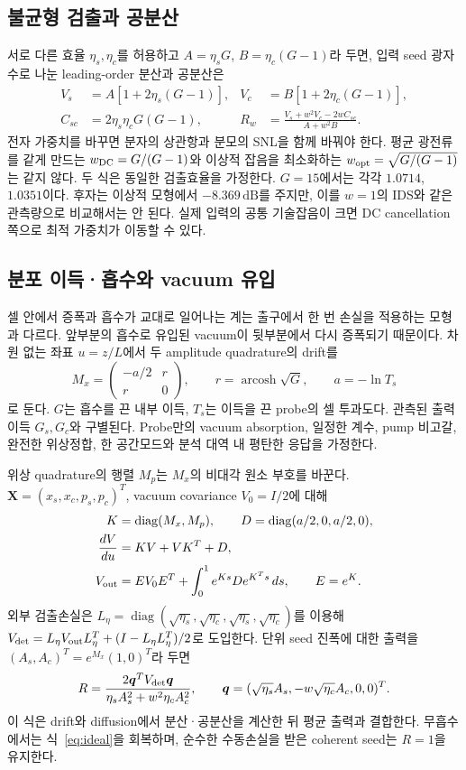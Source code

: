 \documentclass[11pt,a4paper]{article}
\newcommand{\dB}{\,\mathrm{dB}}
\begin{document}
\subsection{불균형 검출과 공분산}
서로 다른 효율 $\eta_s,\eta_c$를 허용하고 $A=\eta_sG$,
$B=\eta_c(G-1)$라 두면, 입력 seed 광자수로 나눈 leading-order
분산과 공분산은
\begin{align}
 V_s&=A[1+2\eta_s(G-1)],&
 V_c&=B[1+2\eta_c(G-1)],\\
 C_{sc}&=2\eta_s\eta_cG(G-1),&
 R_w&=\frac{V_s+w^2V_c-2wC_{sc}}{A+w^2B}.
 \label{eq:weighted}
\end{align}
전자 가중치를 바꾸면 분자의 상관항과 분모의 SNL을 함께 바꿔야 한다.
평균 광전류를 같게 만드는 $w_{\rm DC}=G/(G-1)$와 이상적 잡음을
최소화하는 $w_{\rm opt}=\sqrt{G/(G-1)}$는 같지 않다. 두 식은 동일한
검출효율을 가정한다. $G=15$에서는 각각 $1.0714$, $1.0351$이다.
후자는 이상적 모형에서 $-8.369\dB$를 주지만, 이를 $w=1$의 IDS와 같은
관측량으로 비교해서는 안 된다. 실제 입력의 공통 기술잡음이 크면 DC
cancellation 쪽으로 최적 가중치가 이동할 수 있다.

\subsection{분포 이득·흡수와 vacuum 유입}
셀 안에서 증폭과 흡수가 교대로 일어나는 계는 출구에서 한 번 손실을
적용하는 모형과 다르다\cite{mc08}. 앞부분의 흡수로 유입된 vacuum이
뒷부분에서 다시 증폭되기 때문이다. 차원 없는 좌표 $u=z/L$에서 두
amplitude quadrature의 drift를
\begin{equation}
 M_x=\begin{pmatrix}-a/2&r\\r&0\end{pmatrix},\qquad
 r=\operatorname{arcosh}\sqrt G,\qquad a=-\ln T_s
 \label{eq:mx}
\end{equation}
로 둔다. $G$는 흡수를 끈 내부 이득, $T_s$는 이득을 끈 probe의 셀
투과도다. 관측된 출력 이득 $G_s,G_c$와 구별된다.
Probe만의 vacuum absorption, 일정한 계수, pump 비고갈, 완전한 위상정합,
한 공간모드와 분석 대역 내 평탄한 응답을 가정한다.

위상 quadrature의 행렬 $M_p$는 $M_x$의 비대각 원소 부호를 바꾼다.
$\bm X=(x_s,x_c,p_s,p_c)^T$, vacuum covariance $V_0=I/2$에 대해
\begin{align}
 K&=\operatorname{diag}(M_x,M_p),\qquad D=\operatorname{diag}(a/2,0,a/2,0),\\
 \frac{dV}{du}&=KV+VK^T+D,\\
 V_{\rm out}&=EV_0E^T+\int_0^1e^{Ks}D e^{K^Ts}\,ds,\qquad E=e^K.
 \label{eq:cov}
\end{align}
외부 검출손실은 $L_\eta=\operatorname{diag}
(\sqrt{\eta_s},\sqrt{\eta_c},\sqrt{\eta_s},\sqrt{\eta_c})$를 이용해
$V_{\rm det}=L_\eta V_{\rm out}L_\eta^T+(I-L_\eta L_\eta^T)/2$로 도입한다.
단위 seed 진폭에 대한 출력을 $(A_s,A_c)^T=e^{M_x}(1,0)^T$라 두면
\begin{equation}
 R=\frac{2\bm q^TV_{\rm det}\bm q}{\eta_sA_s^2+w^2\eta_cA_c^2},\qquad
 \bm q=(\sqrt{\eta_s}A_s,-w\sqrt{\eta_c}A_c,0,0)^T.
 \label{eq:covids}
\end{equation}
이 식은 drift와 diffusion에서 분산·공분산을 계산한 뒤 평균 출력과 결합한다.
무흡수에서는 식~\eqref{eq:ideal}을 회복하며, 순수한 수동손실을 받은
coherent seed는 $R=1$을 유지한다.
\end{document}
